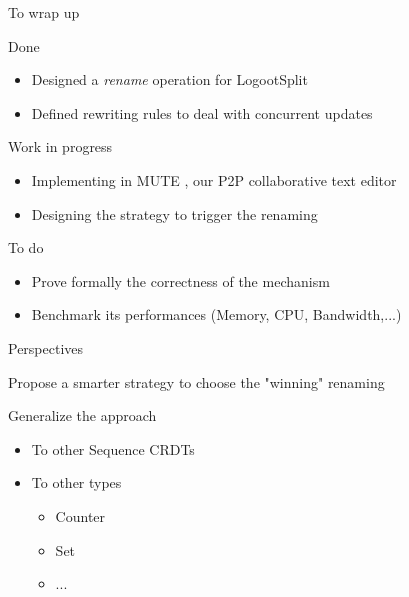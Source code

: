 \documentclass[10pt]{beamer}
\begin{document}
\begin{frame}{To wrap up}

  \begin{block}{Done}
    \begin{itemize}
      \item Designed a \emph{rename} operation for LogootSplit
      \item Defined rewriting rules to deal with concurrent updates
    \end{itemize}
  \end{block}

  \pause

  \begin{block}{Work in progress}
    \begin{itemize}
      \item Implementing in MUTE , our P2P collaborative text editor
      \item Designing the strategy to trigger the renaming
    \end{itemize}
  \end{block}

  \pause

  \begin{block}{To do}
    \begin{itemize}
      \item Prove formally the correctness of the mechanism
      \item Benchmark its performances (Memory, CPU, Bandwidth,...)
    \end{itemize}
  \end{block}
\end{frame}

\begin{frame}{Perspectives}

  \begin{block}{Propose a smarter strategy to choose the "winning" renaming}
  \end{block}

  \pause

  \begin{block}{Generalize the approach}
    \begin{itemize}
      \item To other Sequence \acp{CRDT}
      \item To other types
      \begin{itemize}
        \item Counter
        \item Set
        \item ...
      \end{itemize}
    \end{itemize}
  \end{block}
\end{frame}
\end{document}
